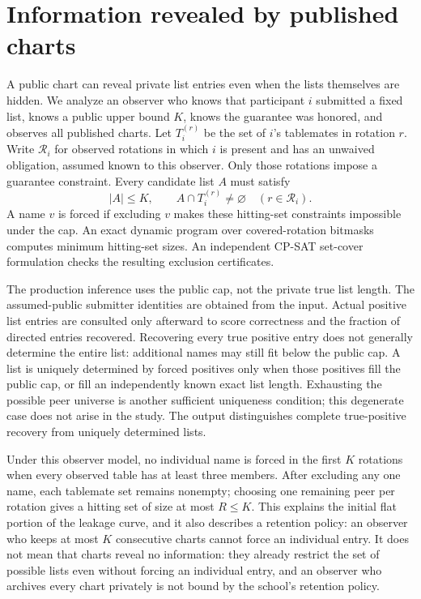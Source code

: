 \documentclass[11pt,a4paper]{article}
\theoremstyle{definition}\newtheorem{definition}[theorem]{Definition}
\theoremstyle{remark}\newtheorem{remark}[theorem]{Remark}
\begin{document}
\section{Information revealed by published charts}\label{sec:privacy}
A public chart can reveal private list entries even when the lists themselves are hidden. We analyze an observer who knows that participant $i$ submitted a fixed list, knows a public upper bound $K$, knows the guarantee was honored, and observes all published charts. Let $T_i^{(r)}$ be the set of $i$'s tablemates in rotation $r$. Write $\mathcal R_i$ for observed rotations in which $i$ is present and has an unwaived obligation, assumed known to this observer. Only those rotations impose a guarantee constraint. Every candidate list $A$ must satisfy
\begin{equation}\label{eq:hit}
 |A|\le K,\qquad A\cap T_i^{(r)}\ne\varnothing\quad(r\in\mathcal R_i).
\end{equation}
A name $v$ is forced if excluding $v$ makes these hitting-set constraints impossible under the cap. An exact dynamic program over covered-rotation bitmasks computes minimum hitting-set sizes. An independent CP-SAT set-cover formulation checks the resulting exclusion certificates.

The production inference uses the public cap, not the private true list length. The assumed-public submitter identities are obtained from the input. Actual positive list entries are consulted only afterward to score correctness and the fraction of directed entries recovered. Recovering every true positive entry does not generally determine the entire list: additional names may still fit below the public cap. A list is uniquely determined by forced positives only when those positives fill the public cap, or fill an independently known exact list length. Exhausting the possible peer universe is another sufficient uniqueness condition; this degenerate case does not arise in the study. The output distinguishes complete true-positive recovery from uniquely determined lists.

Under this observer model, no individual name is forced in the first $K$ rotations when every observed table has at least three members. After excluding any one name, each tablemate set remains nonempty; choosing one remaining peer per rotation gives a hitting set of size at most $R\le K$. This explains the initial flat portion of the leakage curve, and it also describes a retention policy: an observer who keeps at most $K$ consecutive charts cannot force an individual entry. It does not mean that charts reveal no information: they already restrict the set of possible lists even without forcing an individual entry, and an observer who archives every chart privately is not bound by the school's retention policy.
\end{document}

